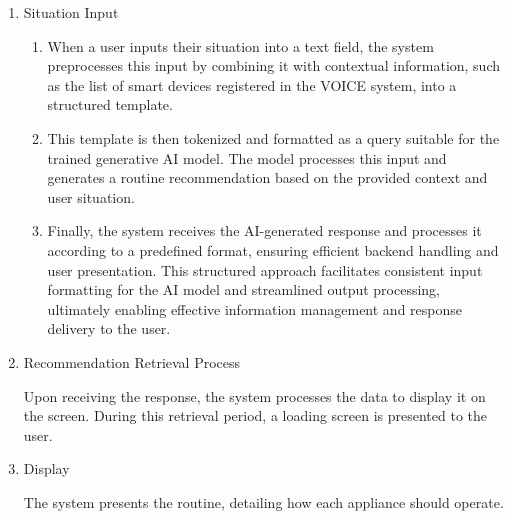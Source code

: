 \documentclass[conference]{IEEEtran}
\begin{document}
\begin{enumerate}[label=\arabic*]
    \begin{enumerate}[label=\arabic*)]
        \item Situation Input\par
        \vspace{0.3em}

        \begin{enumerate}[label=\alph*)]
            \item When a user inputs their situation into a text field, the system preprocesses this input by combining it with contextual information, such as the list of smart devices registered in the VOICE system, into a structured template. 

            \vspace{0.5em}

            \item This template is then tokenized and formatted as a query suitable for the trained generative AI model. The model processes this input and generates a routine recommendation based on the provided context and user situation. 

            \vspace{0.5em}

            \item Finally, the system receives the AI-generated response and processes it according to a predefined format, ensuring efficient backend handling and user presentation. This structured approach facilitates consistent input formatting for the AI model and streamlined output processing, ultimately enabling effective information management and response delivery to the user.
        \end{enumerate}

        \vspace{0.5em}

        \item Recommendation Retrieval Process\par
        \vspace{0.3em}
        Upon receiving the response, the system processes the data to display it on the screen. During this retrieval period, a loading screen is presented to the user.

        \vspace{0.5em}

        \item Display\par
        \vspace{0.3em}
        The system presents the routine, detailing how each appliance should operate.
        \vspace{0.3em}


\end{enumerate}
\end{enumerate}
\end{document}
